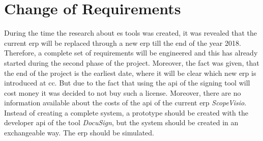 \section{Change of Requirements}
During the time the research about \gls{es} tools was created, it was revealed that the current \gls{erp} will be replaced through a new \gls{erp} till the end of the year 2018. Therefore, a complete set of requirements will be engineered and this has already started during the second phase of the project. Moreover, the fact was given, that the end of the project is the earliest date, where it will be clear which new \gls{erp} is introduced at \gls{cc}. But due to the fact that using the \gls{api} of the signing tool will cost money it was decided to not buy such a license. Moreover, there are no information available about the costs of the \gls{api} of the current \gls{erp} \textit{ScopeVisio}. Instead of creating a complete system, a prototype should be created with the developer \gls{api} of the tool \textit{DocuSign}, but the system should be created in an exchangeable way. The \gls{erp} should be simulated.